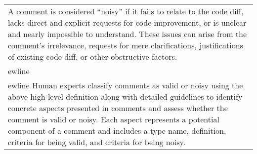 \begin{table*}[!t]
\begin{tabular}{p{\textwidth}}
        A comment is considered ``noisy'' if it fails to relate to the code diff, lacks direct and explicit requests for code improvement, or is unclear and nearly impossible to understand. These issues can arise from the comment's irrelevance, requests for mere clarifications, justifications of existing code diff, or other obstructive factors. \\ewline \\ewline
        Human experts classify comments as valid or noisy using the above high-level definition along with detailed guidelines to identify concrete aspects presented in comments and assess whether the comment is valid or noisy. Each aspect represents a potential component of a comment and includes a type name, definition, criteria for being valid, and criteria for being noisy. \\ 

\end{tabular}
\end{table*}
